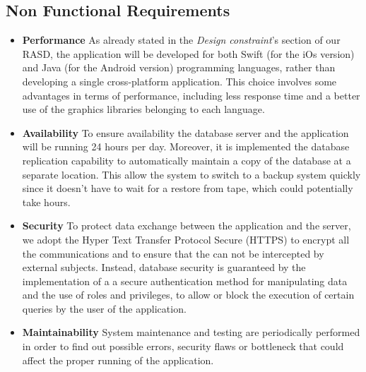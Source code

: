 \documentclass[12pt,titlepage]{article}
\begin{document}
\clearpage
\newpage
\subsection{Non Functional Requirements} 
\begin{itemize}
\item \textbf{Performance} 
As already stated in the \textit{Design constraint}'s section of our RASD, the application will be developed for both Swift (for the iOs version) and Java (for the Android version) programming languages, rather than developing a single cross-platform application. This choice involves some advantages in terms of performance, including less response time and a better use of the graphics libraries belonging to each language.

\item \textbf{Availability} To ensure availability the database server and the application will be running 24 hours per day. Moreover, it is implemented the database replication capability to automatically maintain a copy of the database at a separate location. This allow the system to switch to a backup system quickly since it doesn't have to wait for a restore from tape, which could potentially take hours.

\item \textbf{Security}
To protect data exchange between the application and the server, we adopt the Hyper Text Transfer Protocol Secure (HTTPS) to encrypt all the communications and to ensure that the can not be intercepted by external subjects. 
Instead, database security is guaranteed by the implementation of a a secure authentication method for manipulating data and the use of roles and privileges, to allow or block the execution of certain queries by the user of the application.

\item \textbf{Maintainability}
System maintenance and testing are periodically performed in order to find out possible errors, security flaws or bottleneck that could affect the proper running of the application.

\end{itemize}

\pagebreak
\end{document}
